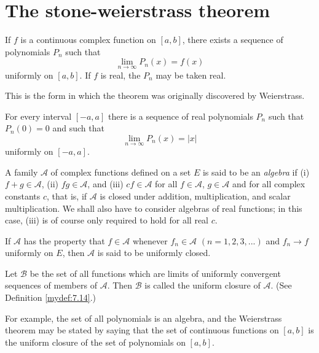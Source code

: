 \section{The stone-weierstrass theorem}

\begin{thm}
    \label{thm:7.26}
    If $f$ is a continuous complex function on $[a, b]$, 
    there exists a sequence of polynomials $P_n$ such that
    \begin{equation*}
        \lim_{n \to \infty} P_n(x) = f(x)        
    \end{equation*}
    uniformly on $[a, b]$. 
    If $f$ is real, the $P_n$ may be taken real.
\end{thm}

This is the form in which the theorem was originally discovered by
Weierstrass.


\begin{myCorollary}
    \label{myCorollary:7.27}
    For every interval $[-a, a]$ 
    there is a sequence of real polynomials $P_n$ such that $P_n(0) = 0$
    and such that
    \begin{equation*}
        \lim_{n \to \infty} P_n(x) = \left| x \right| 
    \end{equation*}
    uniformly on $[-a, a]$.
\end{myCorollary}


\begin{mydef}
    \label{mydef:7.28}
    A family $\mathscr{A}$ of complex functions defined on a set $E$
    is said to be an \emph{algebra} if 
    (i) $f + g \in \mathscr{A}$, 
    (ii) $fg \in \mathscr{A}$, and 
    (iii) $cf \in \mathscr{A}$ 
    for all $f \in \mathscr{A}$, $g \in \mathscr{A}$
    and for all complex constants $c$, 
    that is, if $\mathscr{A}$ is closed under addition, multiplication, and scalar multiplication. 
    We shall also have to consider algebras of real functions; 
    in this case, (iii) is of course only required to hold for all real $c$.
    
    If $\mathscr{A}$ has the property that $f \in \mathscr{A}$ whenever $f_n \in \mathscr{A}$ $(n = 1, 2, 3, ... )$ and
    $f_n \rightarrow f$ uniformly on $E$, 
    then $\mathscr{A}$ is said to be uniformly closed.
    
    Let $\mathscr{B}$ be the set of all functions which are limits of uniformly convergent sequences of members of $\mathscr{A}$. 
    Then $\mathscr{B}$ is called the uniform closure of $\mathscr{A}$. 
    (See Definition \ref{mydef:7.14}.)
    
    For example, the set of all polynomials is an algebra, and the Weierstrass theorem may be stated by saying that the set of continuous functions on $[a, b]$ is the uniform closure of the set of polynomials on $[a, b]$.
\end{mydef}

